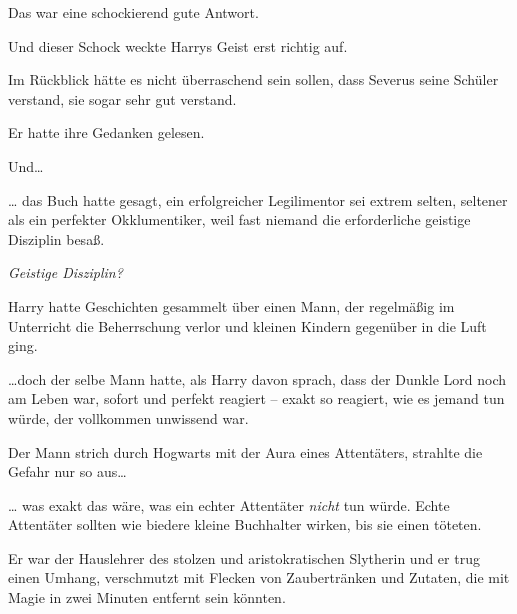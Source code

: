 Das war eine schockierend gute Antwort.

Und dieser Schock weckte Harrys Geist erst richtig auf.

Im Rückblick hätte es nicht überraschend sein sollen, dass Severus seine Schüler verstand, sie sogar sehr gut verstand.

Er hatte ihre Gedanken gelesen.

Und…

… das Buch hatte gesagt, ein erfolgreicher Legilimentor sei extrem selten, seltener als ein perfekter Okklumentiker, weil fast niemand die erforderliche geistige Disziplin besaß.

\emph{Geistige Disziplin?}

Harry hatte Geschichten gesammelt über einen Mann, der regelmäßig im Unterricht die Beherrschung verlor und kleinen Kindern gegenüber in die Luft ging.

…doch der selbe Mann hatte, als Harry davon sprach, dass der Dunkle Lord noch am Leben war, sofort und perfekt reagiert -- exakt so reagiert, wie es jemand tun würde, der vollkommen unwissend war.

Der Mann strich durch Hogwarts mit der Aura eines Attentäters, strahlte die Gefahr nur so aus…

… was exakt das wäre, was ein echter Attentäter \emph{nicht} tun würde. Echte Attentäter sollten wie biedere kleine Buchhalter wirken, bis sie einen töteten.

Er war der Hauslehrer des stolzen und aristokratischen Slytherin und er trug einen Umhang, verschmutzt mit Flecken von Zaubertränken und Zutaten, die mit Magie in zwei Minuten entfernt sein könnten.

